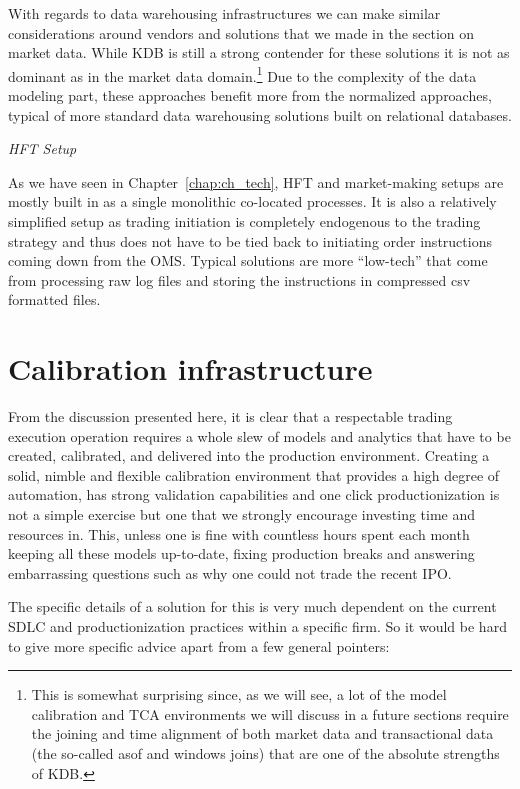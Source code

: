 With regards to data warehousing infrastructures we can make similar considerations around vendors and solutions that we made in the section on market data. While KDB is still a strong contender for these solutions it is not as dominant as in the market data domain.\footnote{This is somewhat surprising since, as we will see, a lot of the model calibration and TCA environments we will discuss in a future sections require the joining and time alignment of both market data and transactional data (the so-called asof and windows joins) that are one of the absolute strengths of KDB.} Due to the complexity of the data modeling part, these approaches benefit more from the normalized approaches, typical of more standard data warehousing solutions built on relational databases. \twomedskip


\noindent\emph{HFT Setup} \twomedskip


As we have seen in Chapter~\ref{chap:ch_tech}, HFT and market-making setups are mostly built in as a single monolithic co-located processes. It is also a relatively simplified setup as trading initiation is completely endogenous to the trading strategy and thus does not have to be tied back to initiating order instructions coming down from the OMS. Typical solutions are more ``low-tech'' that come from processing raw log files and storing the instructions in compressed csv formatted files.



\section{Calibration infrastructure}

From the discussion presented here, it is clear that a respectable trading execution operation requires a whole slew of models and analytics that have to be created, calibrated, and delivered into the production environment. Creating a solid, nimble and flexible calibration environment that provides a high degree of automation, has strong validation capabilities and one click productionization is not a simple exercise but one that we strongly encourage investing time and resources in. This, unless one is fine with countless hours spent each month keeping all these models up-to-date, fixing production breaks and answering embarrassing questions such as why one could not trade the recent IPO. 


The specific details of a solution for this is very much dependent on the current SDLC and productionization practices within a specific firm. So it would be hard to give more specific advice apart from a few general pointers:

